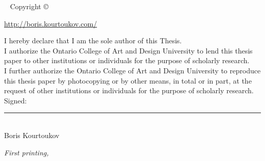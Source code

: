 
\blankpage

\newpage\thispagestyle{empty}
\openepigraph{%
}{}
\vfill
{}
\vfill
\openepigraph{%
}{}


\maketitle


\newpage
\begin{fullwidth}
~\vfill
\thispagestyle{empty}
\setlength{\parindent}{0pt}
\setlength{\parskip}{\baselineskip}
Copyright \copyright\ \the\year\ \thanklessauthor

\par{\url{http://boris.kourtoukov.com/}}

\par I hereby declare that I am the sole author of this Thesis. \\
\vspace{1em}
I authorize the Ontario College of Art and Design University to lend this thesis paper to other institutions or individuals for the purpose of scholarly research. \\
\vspace{1em}
I further authorize the Ontario College of Art and Design University to reproduce this thesis paper by photocopying or by other means, in total or in part, at the request of other institutions or individuals for the purpose of scholarly research. \\

\vspace{2em}
Signed: \\
\hspace{3.5em}\noindent\rule{8cm}{0.5pt} \\
\hspace{3.5em}Boris Kourtoukov

\par\textit{First printing, \monthyear}
\end{fullwidth}

